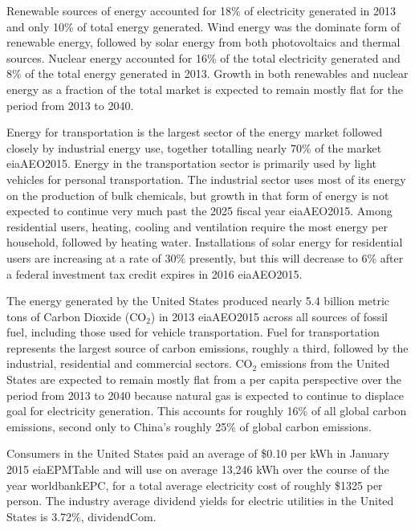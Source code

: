 Renewable sources of energy accounted for 18\% of electricity generated in 2013 
and only 10\% of total energy generated. Wind energy was the dominate form of 
renewable energy, followed by solar energy from both photovoltaics and thermal 
sources. Nuclear energy accounted for 16\% of the total electricity generated 
and 8\% of the total energy generated in 2013. Growth in both renewables and 
nuclear energy as a fraction of the total market is expected to remain mostly 
flat for the period from 2013 to 2040.

Energy for transportation is the largest sector of the energy market followed 
closely by industrial energy use, together totalling nearly 70\% of the market 
\cite{jay}{eiaAEO2015}. Energy in the transportation sector is primarily used by 
light vehicles for personal transportation. The industrial sector uses most of 
its energy on the production of bulk chemicals, but growth in that form of 
energy is not expected to continue very much past the 2025 fiscal year 
\cite{jay}{eiaAEO2015}. Among residential users, heating, cooling and ventilation 
require the most energy per household, followed by heating water. Installations 
of solar energy for residential users are increasing at a rate of 30\% 
presently, but this will decrease to 6\% after a federal investment tax credit 
expires in 2016 \cite{jay}{eiaAEO2015}.

The energy generated by the United States produced nearly 5.4 billion metric 
tons of Carbon Dioxide (CO$_2$) in 2013 \cite{jay}{eiaAEO2015} across all sources of 
fossil fuel, including those used for vehicle transportation. Fuel for 
transportation represents the largest source of carbon emissions, roughly a 
third, followed by the industrial, residential and commercial sectors. CO$_2$ 
emissions from the United States are expected to remain mostly flat from a per 
capita perspective over the period from 2013 to 2040 because natural gas is 
expected to continue to displace goal for electricity generation. This accounts 
for roughly 16\% of all global carbon emissions, second only to China’s roughly 
25\% of global carbon emissions.

Consumers in the United States paid an average of \$0.10 per kWh in January 2015 
\cite{jay}{eiaEPMTable} and will use on average 13,246 kWh over the course of the year 
\cite{jay}{worldbankEPC}, for a total average electricity cost of roughly \$1325 per 
person. The industry average dividend yields for electric utilities in the
United States is 3.72\%, \cite{jay}{dividendCom}.

